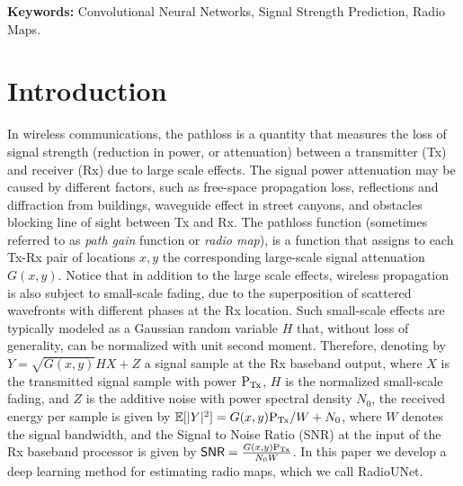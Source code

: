\documentclass[10pt,a4paper]{article}
\begin{document}
\textbf{Keywords:} 
Convolutional Neural Networks, Signal Strength Prediction, Radio Maps.




%



\section{Introduction}
\label{sec:intro}




In wireless communications, the pathloss is a quantity that measures the loss of signal strength (reduction in power, 
 or attenuation) between a transmitter (Tx) and receiver (Rx) due to large scale effects. The signal power attenuation may be caused by different factors, such as free-space propagation loss, 
 reflections and diffraction from buildings, waveguide effect in street canyons, and 
 obstacles blocking line of sight between Tx and Rx.
 The pathloss function (sometimes referred to as {\em path gain} function or {\em radio map}), 
 is a function that assigns to each Tx-Rx pair of locations $x, y$ the corresponding large-scale signal attenuation $G(x,y)$. Notice that in addition to the large scale effects, wireless propagation is also subject to small-scale fading, due to the superposition of scattered wavefronts with different phases at the Rx location. Such small-scale effects are typically modeled as a Gaussian random variable $H$ that, without loss of generality, can be normalized with unit second moment. Therefore, denoting by $Y = \sqrt{G(x,y)} H X + Z$ a signal sample at the Rx baseband output, 
 where $X$ is the transmitted signal sample with power $\textup{P}_{\textup{Tx}}$, 
 $H$ is the normalized small-scale fading, 
 and $Z$ is the additive noise with power spectral density $N_0$, 
 the received energy per sample is given by $\mathbb{E}[|Y|^2] = G(x,y) \textup{P}_{\textup{Tx}}/W + N_0$, where $W$ denotes the signal bandwidth, and the Signal to Noise Ratio (SNR) at the input of the Rx baseband processor is given by 
 ${\sf SNR} = \frac{G(x,y) \textup{P}_{\textup{Tx}}}{N_0W}$. In this paper we develop a deep learning method for estimating radio maps, which we call RadioUNet.
\end{document}
